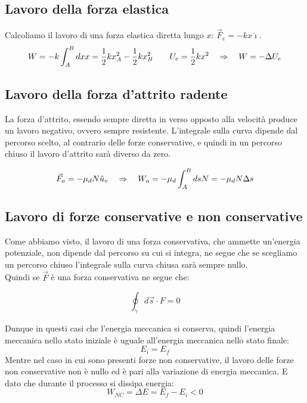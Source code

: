 \subsection{Lavoro della forza elastica}

Calcoliamo il lavoro di una forza elastica diretta lungo $x$: $\vec F_e = -kx\hat\imath$.
\begin{equation}
W = -k\int_A^Bdx x = \frac12 kx_A^2-\frac12 kx^2_B\quad\quad U_e = \frac12 kx^2\quad\Rightarrow\quad W = -\Delta U_e
\end{equation}

\subsection{Lavoro della forza d'attrito radente}
La forza d'attrito, essendo sempre diretta in verso opposto alla velocità produce un lavoro negativo, ovvero sempre resistente. L'integrale sulla curva dipende dal percorso scelto, al contrario delle forze conservative, e quindi in un percorso chiuso il lavoro d'attrito sarà diverso da zero.

\begin{equation}
\vec F_a = -\mu_d N \hat u_v\quad\Rightarrow\quad W_a = -\mu_d\int_A^BdsN = -\mu_dN\Delta s
\end{equation}

\subsection{Lavoro di forze conservative e non conservative}
Come abbiamo visto, il lavoro di una forza conservativa, che ammette un'energia potenziale, non dipende dal percorso su cui si integra, ne segue che se scegliamo un percorso chiuso l'integrale sulla curva chiusa sarà sempre nullo. \\Quindi se $\vec F$ è una forza conservativa ne segue che:

\begin{equation}
\boxed{\oint_\gamma d\vec s \cdot F = 0}
\end{equation}

Dunque in questi casi che l'energia meccanica si conserva, quindi l'energia meccanica nello stato iniziale è uguale all'energia meccanica nello stato finale:
\begin{equation}
\boxed{E_i = E_f}
\end{equation}
Mentre nel caso in cui sono presenti forze non conservative, il lavoro delle forze non conservative non è nullo ed è pari alla variazione di energia meccanica. E dato che durante il processo si dissipa energia:
\begin{equation}
\boxed{W_{NC} = \Delta E = E_f- E_i < 0}
\end{equation}

